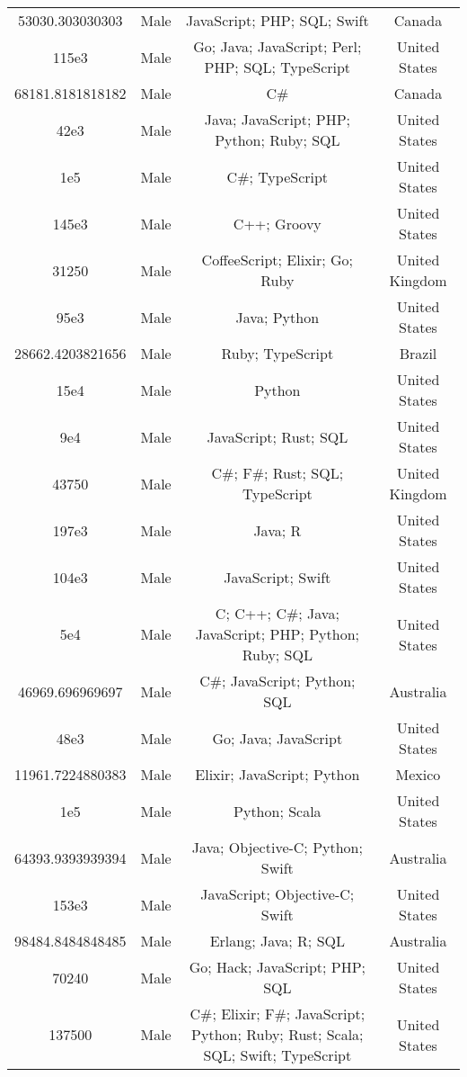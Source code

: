 \begin{center}
\begin{tabular}{ |c|c|c|c| }
53030.303030303  &  Male  &  JavaScript; PHP; SQL; Swift  &  Canada  \\ 
115e3  &  Male  &  Go; Java; JavaScript; Perl; PHP; SQL; TypeScript  &  United States  \\ 
68181.8181818182  &  Male  &  C\#  &  Canada  \\ 
42e3  &  Male  &  Java; JavaScript; PHP; Python; Ruby; SQL  &  United States  \\ 
1e5  &  Male  &  C\#; TypeScript  &  United States  \\ 
145e3  &  Male  &  C++; Groovy  &  United States  \\ 
31250  &  Male  &  CoffeeScript; Elixir; Go; Ruby  &  United Kingdom  \\ 
95e3  &  Male  &  Java; Python  &  United States  \\ 
28662.4203821656  &  Male  &  Ruby; TypeScript  &  Brazil  \\ 
15e4  &  Male  &  Python  &  United States  \\ 
9e4  &  Male  &  JavaScript; Rust; SQL  &  United States  \\ 
43750  &  Male  &  C\#; F\#; Rust; SQL; TypeScript  &  United Kingdom  \\ 
197e3  &  Male  &  Java; R  &  United States  \\ 
104e3  &  Male  &  JavaScript; Swift  &  United States  \\ 
5e4  &  Male  &  C; C++; C\#; Java; JavaScript; PHP; Python; Ruby; SQL  &  United States  \\ 
46969.696969697  &  Male  &  C\#; JavaScript; Python; SQL  &  Australia  \\ 
48e3  &  Male  &  Go; Java; JavaScript  &  United States  \\ 
11961.7224880383  &  Male  &  Elixir; JavaScript; Python  &  Mexico  \\ 
1e5  &  Male  &  Python; Scala  &  United States  \\ 
64393.9393939394  &  Male  &  Java; Objective-C; Python; Swift  &  Australia  \\ 
153e3  &  Male  &  JavaScript; Objective-C; Swift  &  United States  \\ 
98484.8484848485  &  Male  &  Erlang; Java; R; SQL  &  Australia  \\ 
70240  &  Male  &  Go; Hack; JavaScript; PHP; SQL  &  United States  \\ 
137500  &  Male  &  C\#; Elixir; F\#; JavaScript; Python; Ruby; Rust; Scala; SQL; Swift; TypeScript  &  United States  \\ 

\end{tabular}
\end{center}
